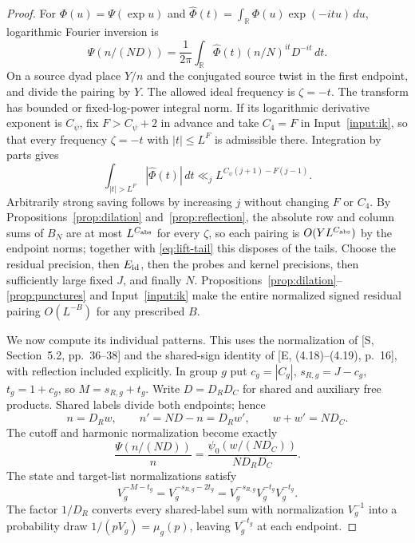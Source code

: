 \documentclass[11pt]{article}
\theoremstyle{definition}
\newcommand{\R}{\mathbb R}
\theoremstyle{remark}
\begin{document}
\begin{proof}
For $\Phi(u)=\Psi(\exp u)$ and
$\widehat\Phi(t)=\int_\R\Phi(u)\exp(-itu)\,du$, logarithmic Fourier inversion is
\begin{equation}\label{eq:lift-mellin}
\Psi(n/(ND))=\frac1{2\pi}\int_\R
 \widehat\Phi(t)(n/N)^{it}D^{-it}\,dt.
\end{equation}
On a source dyad place $Y/n$ and the conjugated source twist in
the first endpoint, and divide the pairing by $Y$.
The allowed ideal frequency is $\zeta=-t$.
The transform has bounded or fixed-log-power integral norm.
If its logarithmic derivative exponent is $C_\psi$, fix
$F>C_\psi+2$ in advance and take $C_4=F$ in Input~\ref{input:ik}, so
that every frequency $\zeta=-t$ with $|t|\le L^F$ is admissible there.
Integration by parts gives
\begin{equation}\label{eq:lift-tail}
\int_{|t|>L^F}|\widehat\Phi(t)|\,dt
\ll_j L^{C_\psi(j+1)-F(j-1)}.
\end{equation}
Arbitrarily strong saving follows by increasing $j$ without changing
$F$ or $C_4$. By Propositions~\ref{prop:dilation}
and~\ref{prop:reflection}, the absolute row and column sums of $B_N$ are
at most $L^{C_{\rm abs}}$ for every $\zeta$, so each pairing is
$O(YL^{C_{\rm abs}})$ by the endpoint norms; together with
\eqref{eq:lift-tail} this disposes of the tails.
Choose the residual precision, then $E_{\rm id}$, then the probes and
kernel precisions, then sufficiently large fixed $J$, and finally $N$.
Propositions~\ref{prop:dilation}--\ref{prop:punctures} and
Input~\ref{input:ik} make the entire normalized signed residual
pairing $O(L^{-B})$ for any prescribed $B$.

We now compute its individual patterns. This uses the normalization
of [S, Section~5.2, pp.~36--38] and the shared-sign identity of
[E, (4.18)--(4.19), p.~16], with reflection included explicitly.
In group $g$ put $c_g=|C_g|$, $s_{R,g}=J-c_g$,
$t_g=1+c_g$, so $M=s_{R,g}+t_g$.
Write $D=D_RD_C$ for shared and auxiliary free products.
Shared labels divide both endpoints; hence
\begin{equation}\label{eq:shared-reflection}
n=D_Rw,\qquad
n'=ND-n=D_Rw',\qquad
w+w'=ND_C.
\end{equation}
The cutoff and harmonic normalization become exactly
\begin{equation}\label{eq:shared-cutoff}
\frac{\Psi(n/(ND))}{n}
=\frac{\psi_0(w/(ND_C))}{ND_RD_C}.
\end{equation}
The state and target-list normalizations satisfy
\begin{equation}\label{eq:shared-normalization}
V_g^{-M-t_g}=V_g^{-s_{R,g}-2t_g}
=V_g^{-s_{R,g}}V_g^{-t_g}V_g^{-t_g}.
\end{equation}
The factor $1/D_R$ converts every shared-label sum with normalization
$V_g^{-1}$ into a probability draw $1/(pV_g)=\mu_g(p)$, leaving
$V_g^{-t_g}$ at each endpoint.


\end{proof}
\end{document}
